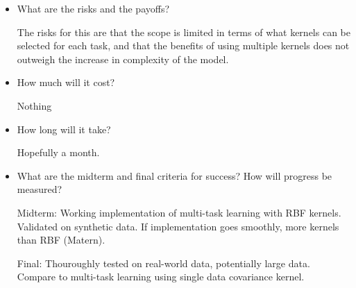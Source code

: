 \documentclass[12pt]{article}
\begin{document}
\begin{itemize}
        \item What are the risks and the payoffs?

        The risks for this are that the scope is limited in terms of what kernels can be selected for each task, and that the benefits of using multiple kernels does not outweigh the increase in complexity of the model.

        \item How much will it cost?

        Nothing

        \item How long will it take?

        Hopefully a month.

        \item What are the midterm and final criteria for success? How will progress be measured?

        Midterm: Working implementation of multi-task learning with RBF kernels. Validated on synthetic data. If implementation goes smoothly, more kernels than RBF (Matern).

        Final: Thouroughly tested on real-world data, potentially large data. Compare to multi-task learning using single data covariance kernel.
    \end{itemize}
\end{document}
